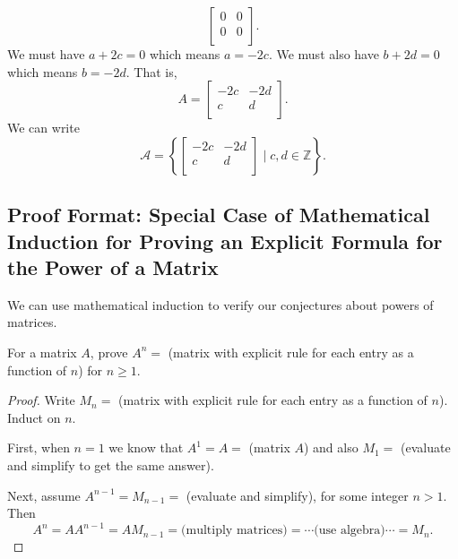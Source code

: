 \begin{exam}
\begin{apart}
\begin{soln}
$$                \left[ \begin{array}{cc} 0 & 0 \\ 0 & 0\\ \end{array} \right].$$
                We must have $a+2c = 0$ which means $a = -2c$.  We must also have $b+2d = 0$ which means $b = -2d$.  That is, $$A = \left[ \begin{array}{rr} -2c & -2d \\ c & d\\ \end{array} \right].$$
                We can write $$\mathscr{A} = \left\{ \left[ \begin{array}{rr} -2c & -2d \\ c & d\\ \end{array} \right] \mid c, d \in \mathbb{Z} \right\}.$$
            \end{soln}
    \end{apart}
\end{exam}


\newcommand{\subpffindmatrix}{Proof Format: Special Case of Mathematical Induction for Proving an Explicit Formula for the Power of a Matrix}
\subsection{\subpffindmatrix}
\label{sub_pff_verify_power_matrix}

We can use mathematical induction to verify our conjectures about powers of matrices.

\begin{pff}
\label{pff_math_ind_matrix}
    For a matrix $A$, prove $A^n=$ (matrix with explicit rule for each entry as a function of $n$) for $n \ge 1$.
    \begin{proof}
        Write $M_n=$ (matrix with explicit rule for each entry as a function of $n$). Induct on $n$.

        First, when $n=1$ we know that $A^1=A=$ (matrix $A$) and also $M_1=$ (evaluate and simplify to get the same answer).

        Next, assume $A^{n-1}=M_{n-1}= $ (evaluate and simplify), for some integer $n > 1$.  Then $$A^n= AA^{n-1} = AM_{n-1} = \text{(multiply matrices)} = \cdots \text{(use algebra)} \cdots = M_n.$$
    \end{proof}
\end{pff}

